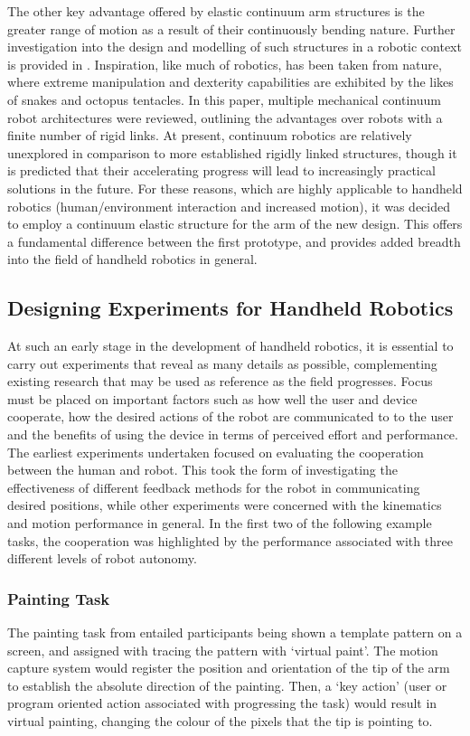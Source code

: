 \documentclass[11pt]{article}
\begin{document}
The other key advantage offered by elastic continuum arm structures is the greater range of motion as a result of their continuously bending nature. Further investigation into the design and modelling of such structures in a robotic context is provided in \cite{webster2010}. Inspiration, like much of robotics, has been taken from nature, where extreme manipulation and dexterity capabilities are exhibited by the likes of snakes and octopus tentacles. In this paper, multiple mechanical continuum robot architectures were reviewed, outlining the advantages over robots with a finite number of rigid links. At present, continuum robotics are relatively unexplored in comparison to more established rigidly linked structures, though it is predicted that their accelerating progress will lead to increasingly practical solutions in the future. For these reasons, which are highly applicable to handheld robotics (human/environment interaction and increased motion), it was decided to employ a continuum elastic structure for the arm of the new design. This offers a fundamental difference between the first prototype, and provides added breadth into the field of handheld robotics in general.




\subsection{Designing Experiments for Handheld Robotics} \label{designingexperiments}
At such an early stage in the development of handheld robotics, it is essential to carry out experiments that reveal as many details as possible, complementing existing research that may be used as reference as the field progresses. Focus must be placed on important factors such as how well the user and device cooperate, how the desired actions of the robot are communicated to to the user and the benefits of using the device in terms of perceived effort and performance. The earliest experiments undertaken focused on evaluating the cooperation between the human and robot. This took the form of investigating the effectiveness of different feedback methods for the robot in communicating desired positions, while other experiments were concerned with the kinematics and motion performance in general. In the first two of the following example tasks, the cooperation was highlighted by the performance associated with three different levels of robot autonomy.

\subsubsection{Painting Task}
The painting task from \cite{GreggSmithDesign} entailed participants being shown a template pattern on a screen, and assigned with tracing the pattern with `virtual paint'. The motion capture system would register the position and orientation of the tip of the arm to establish the absolute direction of the painting. Then, a `key action' (user or program oriented action associated with progressing the task) would result in virtual painting, changing the colour of the pixels that the tip is pointing to. 
\end{document}

